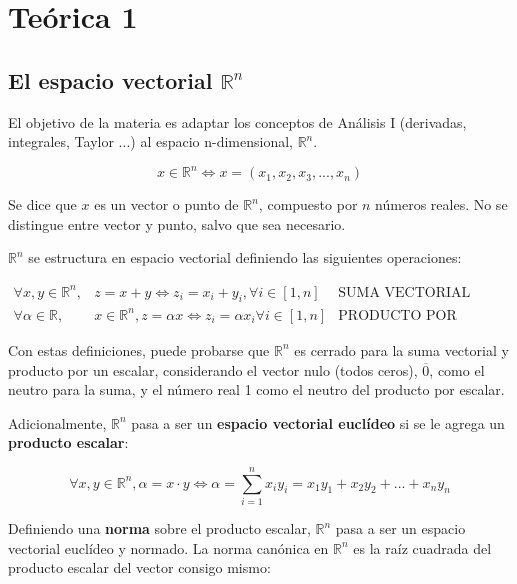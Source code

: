 \documentclass{article}
\renewcommand{\Bbb}{\mathbb}
\begin{document}
 

\section{Teórica 1}

\subsection{El espacio vectorial $\Bbb R^n$}

El objetivo de la materia es adaptar los conceptos de Análisis I (derivadas, integrales, Taylor ...) al espacio n-dimensional, $\mathbb{R}^n$.

\begin{equation}
x \in \Bbb R^n \Longleftrightarrow x = (x_1, x_2, x_3, ..., x_n)
\end{equation}

Se dice que $x$ es un vector o punto de $\Bbb R^n$, compuesto por $n$ números reales. No se distingue entre vector y punto, salvo que sea necesario.

$\Bbb R^n$ se estructura en espacio vectorial definiendo las siguientes operaciones:

\begin{subequations}
\begin{align}
\forall x, y \in \Bbb R^n, & z = x + y \Longleftrightarrow z_i = x_i + y_i, \forall i \in [1, n] & \text{SUMA VECTORIAL}\\
\forall \alpha \in \Bbb R, & x \in \Bbb R^n, z = \alpha x \Longleftrightarrow z_i = \alpha x_i \forall i \in [1, n] & \text{PRODUCTO POR ESCALAR}
\end{align}
\end{subequations}

Con estas definiciones, puede probarse que $\Bbb R^n$ es cerrado para la suma vectorial y producto por un escalar, considerando el vector nulo (todos ceros), $\overline{0}$, como el neutro para la suma, y el número real 1 como el neutro del producto por escalar.

Adicionalmente, $\Bbb R^n$ pasa a ser un \textbf{espacio vectorial euclídeo} si se le agrega un \textbf{producto escalar}:

\begin{equation}
\forall x, y \in \Bbb R^n, \alpha = x \cdot y \Longleftrightarrow \alpha = \sum_{i=1}^{n} x_i y_i = x_1 y_1 + x_2 y_2 + ... + x_n y_n
\end{equation}

Definiendo una \textbf{norma} sobre el producto escalar, $\Bbb R^n$ pasa a ser un espacio vectorial euclídeo y normado. La norma canónica en $\Bbb R^n$ es la raíz cuadrada del producto escalar del vector consigo mismo:
\end{document}
